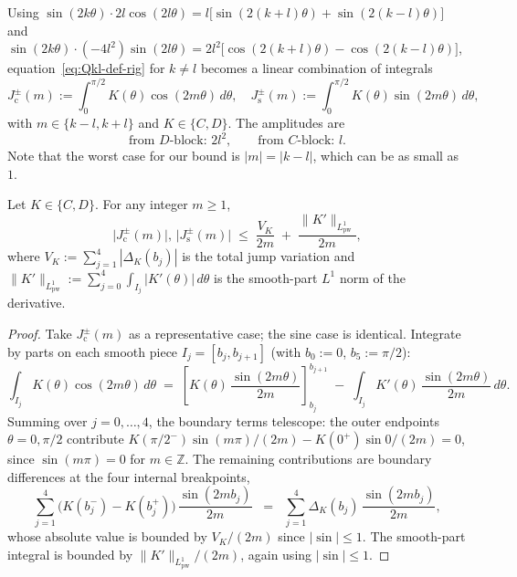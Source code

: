 Using
$\sin(2k\theta) \cdot 2l\cos(2l\theta) = l\bigl[\sin(2(k+l)\theta) +
\sin(2(k-l)\theta)\bigr]$ and
$\sin(2k\theta)\cdot(-4l^{2})\sin(2l\theta) = 2l^{2}\bigl[\cos(2(k+l)\theta)
- \cos(2(k-l)\theta)\bigr]$, equation~\eqref{eq:Qkl-def-rig} for
$k\ne l$ becomes a linear combination of integrals
\begin{equation}\label{eq:osc-integrals}
   J^{\pm}_{\mathrm{c}}(m) := \int_{0}^{\pi/2} \!\!K(\theta) \cos(2m\theta)\,d\theta,
   \quad
   J^{\pm}_{\mathrm{s}}(m) := \int_{0}^{\pi/2} \!\!K(\theta) \sin(2m\theta)\,d\theta,
\end{equation}
with $m \in \{k-l, k+l\}$ and $K \in \{C, D\}$.  The amplitudes are
\begin{equation}\label{eq:amplitudes}
   \text{from } D\text{-block: } 2 l^{2},\qquad
   \text{from } C\text{-block: }  l.
\end{equation}
Note that the worst case for our bound is $|m| = |k-l|$, which can be
as small as $1$.

\begin{lemma}\label{lem:osc-bv}
Let $K \in \{C, D\}$.  For any integer $m \geq 1$,
\begin{equation}\label{eq:osc-bv}
   \bigl|J^{\pm}_{\mathrm{c}}(m)\bigr|,\,
   \bigl|J^{\pm}_{\mathrm{s}}(m)\bigr|
   \;\leq\;
   \frac{V_{K}}{2m}
   \;+\;
   \frac{\|K'\|_{L^{1}_{\mathrm{pw}}}}{2m},
\end{equation}
where $V_{K} := \sum_{j=1}^{4}|\Delta_{K}(b_{j})|$ is the total
jump variation and $\|K'\|_{L^{1}_{\mathrm{pw}}} :=
\sum_{j=0}^{4}\int_{I_{j}}|K'(\theta)|\,d\theta$ is the smooth-part
$L^{1}$ norm of the derivative.
\end{lemma}

\begin{proof}
Take $J^{\pm}_{\mathrm{c}}(m)$ as a representative case; the sine
case is identical.  Integrate by parts on each smooth piece $I_{j} =
[b_{j},b_{j+1}]$ (with $b_{0}:=0$, $b_{5}:=\pi/2$):
\begin{equation}\label{eq:ibp}
   \int_{I_{j}} K(\theta)\cos(2m\theta)\,d\theta
   \;=\;
   \left[K(\theta)\,\frac{\sin(2m\theta)}{2m}\right]_{b_{j}}^{b_{j+1}}
   \;-\;
   \int_{I_{j}} K'(\theta)\,\frac{\sin(2m\theta)}{2m}\,d\theta.
\end{equation}
Summing over $j = 0,\ldots, 4$, the boundary terms telescope: the
outer endpoints $\theta = 0, \pi/2$ contribute
$K(\pi/2^{-})\sin(m\pi)/(2m) - K(0^{+})\sin 0/(2m) = 0$, since
$\sin(m\pi) = 0$ for $m \in \mathbb{Z}$.  The remaining contributions are
boundary differences at the four internal breakpoints,
\[
   \sum_{j=1}^{4} \bigl(K(b_{j}^{-})-K(b_{j}^{+})\bigr)\,
                  \frac{\sin(2m b_{j})}{2m}
   \;\;=\;\; \sum_{j=1}^{4} \Delta_{K}(b_{j}) \,
            \frac{\sin(2m b_{j})}{2m},
\]
whose absolute value is bounded by $V_{K}/(2m)$ since $|\sin| \leq 1$.
The smooth-part integral is bounded by
$\|K'\|_{L^{1}_{\mathrm{pw}}}/(2m)$, again using $|\sin| \leq 1$.
\end{proof}

